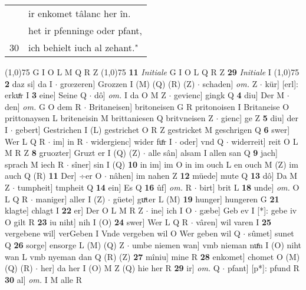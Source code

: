 \documentclass[8pt,a4paper,notitlepage]{article}
\begin{document}
\begin{table}[ht]
\begin{minipage}[t]{0.5\linewidth}
\begin{tabular}{rl}
 & ir enkomet tâlanc her în.\\ 
 & het ir pfenninge oder pfant,\\ 
30 & ich behielt iuch al zehant."\\ 
\end{tabular}
\scriptsize
\line(1,0){75} \newline
G I O L M Q R Z \newline
\line(1,0){75} \newline
\textbf{11} \textit{Initiale} G I O L Q R Z  \textbf{29} \textit{Initiale} I  \newline
\line(1,0){75} \newline
\textbf{2} daz si] da I  $\cdot$ grœzeren] Grozzen I (M) (Q) (R) (Z)  $\cdot$ schaden] \textit{om.} Z  $\cdot$ kür] [erl]: erkuͤr I \textbf{3} eine] Seine Q  $\cdot$ dô] \textit{om.} I da O M Z  $\cdot$ gevienc] gingk Q \textbf{4} diu] Der M  $\cdot$ den] \textit{om.} G O dem R  $\cdot$ Britaneisen] britoneisen G R pritonoisen I Britaneise O prittonaysen L briteneisin M brittaniesen Q britvneisen Z  $\cdot$ gienc] ge Z \textbf{5} diu] der I  $\cdot$ gebert] Gestrichen I (L) gestrichet O R Z gestricket M geschrigen Q \textbf{6} swer] Wer L Q R  $\cdot$ im] in R  $\cdot$ widergienc] wider fuͤr I  $\cdot$ oder] vnd Q  $\cdot$ widerreit] reit O L M R Z \textbf{8} gruozter] Gruzt er I (Q) (Z)  $\cdot$ alle sân] alsam I allen san Q \textbf{9} jach] sprach M iech R  $\cdot$ sîner] sin I (Q) \textbf{10} in im] im O in im ouch L en ouch M (Z) im auch Q (R) \textbf{11} Der] ÷er O  $\cdot$ nâhen] im nahen Z \textbf{12} müede] mute Q \textbf{13} dô] Da M Z  $\cdot$ tumpheit] tmpheit Q \textbf{14} ein] Es Q \textbf{16} ûf] \textit{om.} R  $\cdot$ birt] brit L \textbf{18} unde] \textit{om.} O L Q R  $\cdot$ maniger] aller I (Z)  $\cdot$ güete] guͯter L (M) \textbf{19} hunger] hungeren G \textbf{21} klagte] chlagt I \textbf{22} er] Der O L M R Z  $\cdot$ ine] ich I O  $\cdot$ gæbe] Geb ev I [*]: gebe iv O gilt R \textbf{23} iu niht] nih I (O) \textbf{24} swer] Wer L Q R  $\cdot$ vâren] wil varen I \textbf{25} vergebene wil] verGeben I Vnde vergeben wil O Wer geben wil Q  $\cdot$ sûmet] sunet Q \textbf{26} sorge] ensorge L (M) (Q) Z  $\cdot$ umbe niemen wan] vmb nieman nuͤn I (O) niht wan L vmb nyeman dan Q (R) (Z) \textbf{27} mîniu] mine R \textbf{28} enkomet] chomet O (M) (Q) (R)  $\cdot$ her] da her I (O) M Z (Q) hie her R \textbf{29} ir] \textit{om.} Q  $\cdot$ pfant] [p*]: pfund R \textbf{30} al] \textit{om.} I M alle R \newline
\end{minipage}

\end{table}
\end{document}
